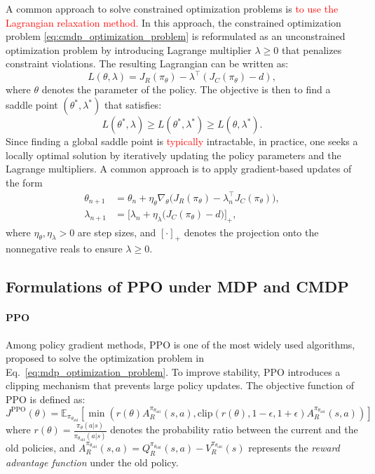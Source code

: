A common approach to solve constrained optimization problems is \textcolor{red}{to use the Lagrangian relaxation method.}
In this approach, the constrained optimization problem \eqref{eq:cmdp_optimization_problem} is reformulated as an unconstrained optimization problem by introducing Lagrange multiplier $\lambda \geq 0$ that penalizes constraint violations.
The resulting Lagrangian can be written as:
\begin{equation}
    L(\theta, \lambda) = J_R(\pi_\theta) - \lambda^\top (J_C(\pi_\theta) - d),
\end{equation}
where $\theta$ denotes the parameter of the policy.
The objective is then to find a saddle point $(\theta^*, \lambda^*)$ that satisfies:
\begin{equation}
    L(\theta^*, \lambda) \geq L(\theta^*, \lambda^*) \geq L(\theta, \lambda^*).
\end{equation}
Since finding a global saddle point is \textcolor{red}{typically} intractable, in practice, one seeks a locally optimal solution by iteratively updating the policy parameters and the Lagrange multipliers.
A common approach is to apply gradient-based updates of the form
\begin{align}
    \theta_{n+1} &= \theta_n + \eta_\theta \nabla_\theta \Big(J_R(\pi_\theta) - \lambda_n^\top J_C(\pi_\theta)\Big), \\
    \lambda_{n+1} &= \Big[ \lambda_n + \eta_\lambda \big( J_C(\pi_\theta) - d \big) \Big]_+,
\end{align}
where $\eta_\theta, \eta_\lambda > 0$ are step sizes, and $[\cdot]_+$ denotes the projection onto the nonnegative reals to ensure $\lambda \geq 0$.


\subsection{Formulations of PPO under MDP and CMDP}

\paragraph{\textbf{PPO}}

Among policy gradient methods, PPO is one of the most widely used algorithms, proposed to solve the optimization problem in Eq.~\eqref{eq:mdp_optimization_problem}.
To improve stability, PPO introduces a clipping mechanism that prevents large policy updates.
The objective function of PPO is defined as:
\begin{equation} \label{eq:ppo_objective}
    J^{\text{PPO}}(\theta) = \mathbb{E}_{\pi_{\theta_\text{old}}} \left[ \min \left( r(\theta) A^{\pi_{\theta_\text{old}}}_R (s, a), \text{clip}(r(\theta), 1 - \epsilon, 1 + \epsilon) A^{\pi_{\theta_\text{old}}}_R (s, a) \right) \right]
\end{equation}
where $r(\theta) = \frac{\pi_\theta(a|s)}{\pi_{\theta_\text{old}}(a|s)}$ denotes the probability ratio between the current and the old policies, and $A^{\pi_{\theta_\text{old}}}_R (s, a) = Q^{\pi_{\theta_\text{old}}}_R (s, a) - V^{\pi_{\theta_\text{old}}}_R (s)$ represents the \textit{reward advantage function} under the old policy.

